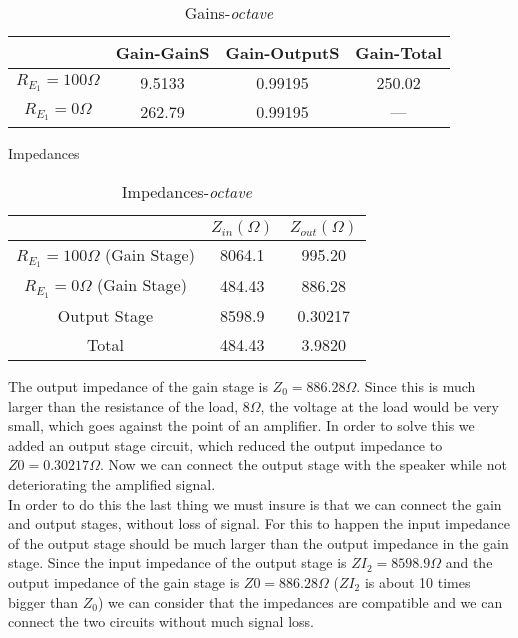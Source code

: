 \begin{table}[H]
\footnotesize
\centering
\caption{Gains-\textit{octave}}
\label{tab:bomba}
\begin{center}
\begin{tabular}{|c|c|c | c |} 
\hline
 & Gain-GainS & Gain-OutputS& Gain-Total\\
 \hline
  $R_{E_1}=100 \Omega$ & 9.5133 & 0.99195 & 250.02  \\
 \hline
  $R_{E_1}=0\Omega$ &262.79 & 0.99195 & --- \\
 
 \hline
\end{tabular}
\end{center}
\end{table}
Impedances
\begin{table}[H]
\footnotesize
\centering
\caption{Impedances-\textit{octave}}
\label{tab:bomba}
\begin{center}
\begin{tabular}{|c|c|c |} 
\hline
 & $Z_{in} (\Omega)$ &$ Z_{out} (\Omega)$\\
 \hline
 $ R_{E_1}=100 \Omega$ (Gain Stage) &  8064.1 & 995.20\\
 \hline
  $R_{E_1}=0\Omega$ (Gain Stage)& 484.43 & 886.28\\
  \hline
  Output Stage & 8598.9 & 0.30217\\
  \hline
  Total & 484.43 & 3.9820\\
  \hline
\end{tabular}
\end{center}
\end{table}
The output impedance of the gain stage is $Z_0=886.28\Omega$. Since this is much larger than the resistance of the load, $8\Omega$, the voltage at the load would be very small, which goes against the point of an amplifier. In order to solve this we added an output stage circuit, which reduced the output impedance to $Z0=0.30217\Omega$. Now we can connect the output stage with the speaker while not deteriorating the amplified signal.\\
In order to do this the last thing we must insure is that we can connect the gain and output stages, without loss of signal. For this to happen the input impedance of the output stage should be much larger than the output impedance in the gain stage. Since the input impedance of the output stage is $Z{I_2}=8598.9\Omega$ and the output impedance of the gain stage is $Z0= 886.28\Omega$ ($Z{I_2}$ is about 10 times bigger than $Z_0$) we can consider that the impedances are compatible and we can connect the two circuits without much signal loss.\\

